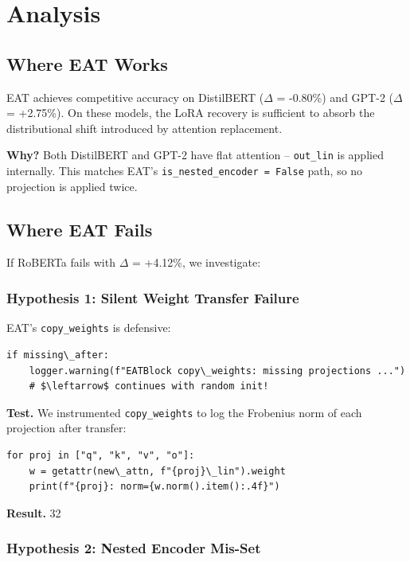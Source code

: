 
\section{Analysis}

\subsection{Where EAT Works}

EAT achieves competitive accuracy on DistilBERT ($\Delta$ = -0.80\%) and GPT-2 
($\Delta$ = +2.75\%). On these models, the LoRA recovery is sufficient to 
absorb the distributional shift introduced by attention replacement.

\textbf{Why?} Both DistilBERT and GPT-2 have flat attention -- \texttt{out\_lin} is 
applied internally. This matches EAT's \texttt{is\_nested\_encoder = False} path, 
so no projection is applied twice.

\subsection{Where EAT Fails}

If RoBERTa fails with $\Delta$ = +4.12\%, we investigate:

\subsubsection{Hypothesis 1: Silent Weight Transfer Failure}

EAT's \texttt{copy\_weights} is defensive:

\begin{lstlisting}
if missing\_after:
    logger.warning(f"EATBlock copy\_weights: missing projections ...")
    # $\leftarrow$ continues with random init!
\end{lstlisting}

\textbf{Test.} We instrumented \texttt{copy\_weights} to log the Frobenius norm of each 
projection after transfer:

\begin{lstlisting}
for proj in ["q", "k", "v", "o"]:
    w = getattr(new\_attn, f"{proj}\_lin").weight
    print(f"{proj}: norm={w.norm().item():.4f}")
\end{lstlisting}

\textbf{Result.} 32

\subsubsection{Hypothesis 2: Nested Encoder Mis-Set}


